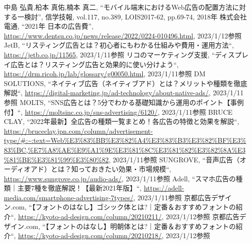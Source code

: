 \documentclass[12pt,a4j,titlepage]{ltjsarticle}
\begin{document}
\begin{thebibliography}{99}
 中島 弘貴,柗本 真佑,楠本 真二, ``モバイル端末におけるWeb広告の配置方法に対する一検討'', 信学技報, vol.117, no.389, LOIS2017-62, pp.69-74, 2018年
 株式会社電通, ``2021年 日本の広告費'', \url{https://www.dentsu.co.jp/news/release/2022/0224-010496.html}, 2023/1/12参照
 JetB, ``リスティング広告とは？初心者にもわかる仕組みや費用・運用方法``, \url{https://jetb.co.jp/11565}, 2023/1/11参照
 リコのマーケティング支援, ``ディスプレイ広告とは？リスティング広告と効果的に使い分けよう``, \url{https://drm.ricoh.jp/lab/glossary/g00050.html}, 2023/1/11参照
 DM SOLUTIONS, ``ネイティブ広告（ネイティブアド）とは？メリットや種類を徹底解説``, \url{https://digital-marketing.jp/ad-technology/about-native-ads/}, 2023/1/11参照
 MOLTS, ``SNS広告とは？5分でわかる基礎知識から運用のポイント【事例付】``, \url{https://moltsinc.co.jp/sns-advertising/6120/}, 2023/1/11参照
 BRUCE CLAY, ``2022年最新】全広告の種類一覧まとめ！各広告の特徴と効果を解説``, \url{https://bruceclay.jpn.com/column/advertisement-type/#:~:text=Web\%E3\%83\%BB\%E3\%82\%A4\%E3\%83\%B3\%E3\%82\%BF\%E3\%83\%BC,\%E7\%A8\%AE\%E9\%A1\%9E\%E3\%81\%8C\%E3\%81\%82\%E3\%82\%8A\%E3\%81\%BE\%E3\%81\%99\%E3\%80\%82}, 2023/1/11参照
 SUNGROVE, ``音声広告（オーディオアド）とは？知っておきたい効果・市場規模``, \url{https://www.sungrove.co.jp/audio-ads/}, 2023/1/11参照
 Adell, ``スマホ広告の種類｜主要7種を徹底解説！【最新2021年版】``, \url{https://adell-media.com/smartphone-advertising-7types/}, 2023/1/11参照
 京都広告デザイン.com, ``【フォントのはなし】ゴシック体とは?｜定番＆おすすめフォントの紹介``, \url{https://kyoto-ad-design.com/column/20210211/}, 2023/1/12参照
 京都広告デザイン.com, ``【フォントのはなし】明朝体とは?｜定番＆おすすめフォントの紹介``, \url{https://kyoto-ad-design.com/column/20210218/}, 2023/1/12参照

\end{thebibliography}
\end{document}

